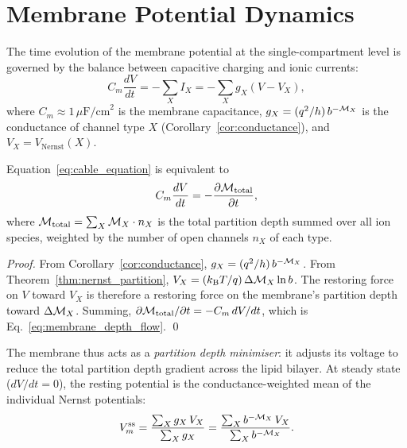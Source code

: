 \section{Membrane Potential Dynamics}
\label{sec:membrane_dynamics}

The time evolution of the membrane potential at the single-compartment level is
governed by the balance between capacitive charging and ionic currents:
\begin{equation}
  C_m\frac{dV}{dt}
    = -\sum_X I_X
    = -\sum_X g_X(V - V_X),
  \label{eq:cable_equation}
\end{equation}
where $C_m \approx 1\,\mu\mathrm{F/cm}^2$ is the membrane capacitance,
$g_X = (q^2/h)\,b^{-\mathcal{M}_X}$ is the conductance of channel type $X$
(Corollary~\ref{cor:conductance}), and $V_X = V_{\mathrm{Nernst}}(X)$.

\begin{proposition}
\label{prop:membrane_minimization}
Equation~\eqref{eq:cable_equation} is equivalent to
\begin{equation}
  C_m\frac{dV}{dt} = -\frac{\partial\mathcal{M}_{\mathrm{total}}}{\partial t},
  \label{eq:membrane_depth_flow}
\end{equation}
where $\mathcal{M}_{\mathrm{total}} = \sum_X\mathcal{M}_X\cdot n_X$ is the total
partition depth summed over all ion species, weighted by the number of open
channels $n_X$ of each type.
\end{proposition}

\begin{proof}
From Corollary~\ref{cor:conductance}, $g_X = (q^2/h)\,b^{-\mathcal{M}_X}$.
From Theorem~\ref{thm:nernst_partition}, $V_X = (k_{\mathrm{B}} T/q)\,\Delta\mathcal{M}_X\ln b$.
The restoring force on $V$ toward $V_X$ is therefore a restoring force on the
membrane's partition depth toward $\Delta\mathcal{M}_X$. Summing,
$\partial\mathcal{M}_{\mathrm{total}}/\partial t = -C_m\,dV/dt$, which is
Eq.~\eqref{eq:membrane_depth_flow}. \qed
\end{proof}

The membrane thus acts as a \emph{partition depth minimiser}: it adjusts its
voltage to reduce the total partition depth gradient across the lipid bilayer.
At steady state ($dV/dt = 0$), the resting potential is the conductance-weighted
mean of the individual Nernst potentials:
\begin{equation}
  V_m^{\mathrm{ss}}
    = \frac{\sum_X g_X\,V_X}{\sum_X g_X}
    = \frac{\sum_X b^{-\mathcal{M}_X}\,V_X}{\sum_X b^{-\mathcal{M}_X}}.
  \label{eq:steady_state_potential}
\end{equation}

